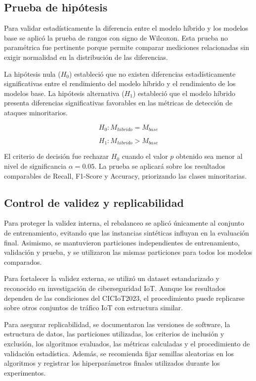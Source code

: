\documentclass[12pt,a4paper]{article}
\begin{document}
\subsection{Prueba de hipótesis}

Para validar estadísticamente la diferencia entre el modelo híbrido y los modelos base se aplicó la prueba de rangos con signo de Wilcoxon. Esta prueba no paramétrica fue pertinente porque permite comparar mediciones relacionadas sin exigir normalidad en la distribución de las diferencias.

La hipótesis nula ($H_0$) estableció que no existen diferencias estadísticamente significativas entre el rendimiento del modelo híbrido y el rendimiento de los modelos base. La hipótesis alternativa ($H_1$) estableció que el modelo híbrido presenta diferencias significativas favorables en las métricas de detección de ataques minoritarios.

\[
H_0: M_{hibrido} = M_{base}
\]

\[
H_1: M_{hibrido} > M_{base}
\]

El criterio de decisión fue rechazar $H_0$ cuando el valor $p$ obtenido sea menor al nivel de significancia $\alpha = 0.05$. La prueba se aplicará sobre los resultados comparables de Recall, F1-Score y Accuracy, priorizando las clases minoritarias.

\subsection{Control de validez y replicabilidad}

Para proteger la validez interna, el rebalanceo se aplicó únicamente al conjunto de entrenamiento, evitando que las instancias sintéticas influyan en la evaluación final. Asimismo, se mantuvieron particiones independientes de entrenamiento, validación y prueba, y se utilizaron las mismas particiones para todos los modelos comparados.

Para fortalecer la validez externa, se utilizó un dataset estandarizado y reconocido en investigación de ciberseguridad IoT. Aunque los resultados dependen de las condiciones del CICIoT2023, el procedimiento puede replicarse sobre otros conjuntos de tráfico IoT con estructura similar.

Para asegurar replicabilidad, se documentaron las versiones de software, la estructura de datos, las particiones utilizadas, los criterios de inclusión y exclusión, los algoritmos evaluados, las métricas calculadas y el procedimiento de validación estadística. Además, se recomienda fijar semillas aleatorias en los algoritmos y registrar los hiperparámetros finales utilizados durante los experimentos.
\end{document}
